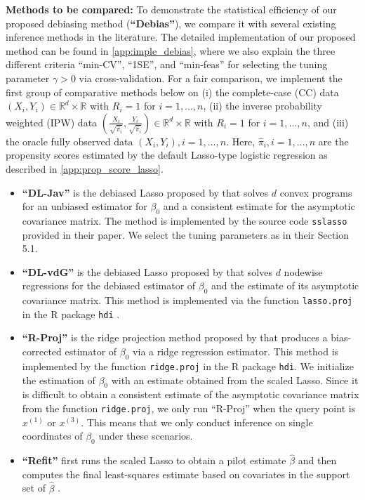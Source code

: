 \documentclass[ejsv2,noshowframe]{imsart}
\theoremstyle{plain}
\theoremstyle{definition}
\theoremstyle{remark}
\renewcommand{\hat}{\widehat}
\begin{document}
{\bf Methods to be compared:} To demonstrate the statistical efficiency of our proposed debiasing method ({\bf ``Debias''}), we compare it with several existing inference methods in the literature. The detailed implementation of our proposed method can be found in \autoref{app:imple_debias}, where we also explain the three different criteria ``min-CV'', ``1SE'', and ``min-feas'' for selecting the tuning parameter $\gamma>0$ via cross-validation. For a fair comparison, we implement the first group of comparative methods below on (i) the complete-case (CC) data $(X_i,Y_i)\in \mathbb{R}^d \times \mathbb{R}$ with $R_i=1$ for $i=1,...,n$, (ii) the inverse probability weighted (IPW) data $\left(\frac{X_i}{\sqrt{\hat{\pi}_i}}, \frac{Y_i}{\sqrt{\hat{\pi}_i}}\right) \in \mathbb{R}^d\times \mathbb{R}$ with $R_i=1$ for $i=1,...,n$, and (iii) the oracle fully observed data $(X_i,Y_i),i=1,...,n$. Here, $\hat{\pi}_i,i=1,...,n$ are the propensity scores estimated by the default Lasso-type logistic regression as described in \autoref{app:prop_score_lasso}.
\begin{itemize}
	\item {\bf ``DL-Jav''} is the debiased Lasso proposed by \cite{javanmard2014confidence} that solves $d$ convex programs for an unbiased estimator for $\beta_0$ and a consistent estimate for the asymptotic covariance matrix. The method is implemented by the source code \texttt{sslasso} provided in their paper. We select the tuning parameters as in their Section 5.1.  
	
	\item {\bf ``DL-vdG''} is the debiased Lasso proposed by \cite{van2014asymptotically} that solves $d$ nodewise regressions for the debiased estimator of $\beta_0$ and the estimate of its asymptotic covariance matrix. This method is implemented via the function \texttt{lasso.proj} in the R package \texttt{hdi} \citep{dezeure2015high}.
	
	\item {\bf ``R-Proj''} is the ridge projection method proposed by \cite{buhlmann2013statistical} that produces a bias-corrected estimator of $\beta_0$ via a ridge regression estimator. This method is implemented by the function \texttt{ridge.proj} in the R package \texttt{hdi}. We initialize the estimation of $\beta_0$ with an estimate obtained from the scaled Lasso. Since it is difficult to obtain a consistent estimate of the asymptotic covariance matrix from the function \texttt{ridge.proj}, we only run ``R-Proj'' when the query point is $x^{(1)}$ or $x^{(3)}$. This means that we only conduct inference on single coordinates of $\beta_0$ under these scenarios.
	
	\item {\bf ``Refit''} first runs the scaled Lasso to obtain a pilot estimate $\hat{\beta}$ and then computes the final least-squares estimate based on covariates in the support set of $\hat{\beta}$ \citep{belloni2013least}.
\end{itemize}
\end{document}
